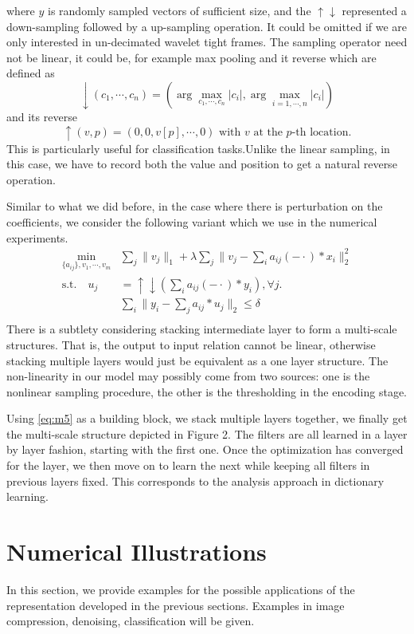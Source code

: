 \documentclass[a4paper]{article}
\begin{document}
where $y$ is randomly sampled vectors of sufficient size, and the $\uparrow \downarrow$ represented a down-sampling followed by a up-sampling operation. It could be omitted if we are only interested in un-decimated wavelet tight frames. The sampling operator need not be linear, it could be, for example max pooling and it reverse which are defined as 
\[
	\downarrow(c_1,\cdots,c_n) = (\arg\max_{c_1,\cdots,c_n} |c_i|, \arg\max_{i=1,\cdots,n} |c_i|)
\]
and its reverse
\[
	\uparrow(v,p)=(0,0,v[p],\cdots,0) \textrm{ with $v$ at the $p$-th location}.
\]
This is particularly useful for classification tasks.Unlike the linear sampling, in this case, we have to record both the value and position to get a natural reverse operation.

Similar to what we did before, in the case where there is perturbation on the coefficients, we consider the following variant which we use in the numerical experiments.
\begin{equation}
\label{eq:m5}
\begin{aligned}
	\min_{\{a_{ij}\}, v_1,\cdots,v_m}& \sum_j \|v_j\|_1 + \lambda \sum_j \|v_j-  \sum_{i} a_{ij}(-\cdot)*x_i \|_2^2\\
	 \textrm{s.t.}  	\quad 	u_j&=\uparrow\downarrow(\sum_i a_{ij}(-\cdot)*y_i), \forall j.\\
	&\sum_i \|y_i - \sum_j a_{ij}*u_j\|_2  \leq \delta\\
	\end{aligned}
\end{equation}
There is a subtlety considering stacking intermediate layer to form a multi-scale structures. That is, the output to input relation cannot be linear, otherwise stacking multiple layers would just be equivalent as a one layer structure. The non-linearity in our model may possibly come from two sources: one is the nonlinear sampling procedure, the other is the thresholding in the encoding stage.

Using \eqref{eq:m5} as a building block, we stack multiple layers together, we finally get the multi-scale structure depicted in Figure 2. The filters are all learned in a  layer by layer fashion, starting with the first one. Once the optimization has converged for the layer, we then move on to learn the next while keeping all filters in previous layers fixed. This corresponds to the analysis approach in dictionary learning.

\section{Numerical Illustrations}
In this section, we provide examples for the possible applications of the representation developed in the previous sections. Examples in image compression, denoising, classification will be given. 
\end{document}
